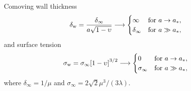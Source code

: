 \begin{frame}
    Comoving wall thickness
    \begin{equation}
        \delta_\mathrm{w} = \frac{\delta_\infty}{ a \sqrt{1-\upsilon} }\longrightarrow  \begin{cases}
            \infty  & \text{for } a\to a_\ast, \\
            \delta_\infty & \text{for } a\gg a_\ast,
        \end{cases}
    \end{equation}
    and surface tension
    \begin{equation}
        \sigma_\mathrm{w} = \sigma_\infty {\left[ 1-\upsilon \right]}^{3/2}  \longrightarrow  \begin{cases}
            0  & \text{for } a\to a_\ast, \\
            \sigma_\infty & \text{for } a\gg a_\ast,
        \end{cases}
    \end{equation}
    where $\delta_\infty = 1/\mu$ and $\sigma_\infty = 2\sqrt{2} \mu^3 /(3\lambda)$.


\begin{notes}[1]
\end{notes}
\end{frame}


